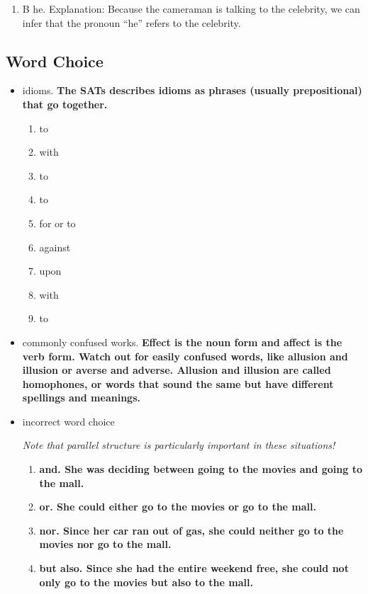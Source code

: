 \begin{enumerate}
\begin{enumerate}
\item B he. Explanation: Because the cameraman is talking to the celebrity, we can infer that the pronoun ``he'' refers to the celebrity. 
\end{enumerate}

\subsection{Word Choice}

\begin{itemize}

\item idioms. \textbf{The SATs describes idioms as phrases (usually prepositional) that go together.}

\begin{enumerate}
\item to
\item with
\item to
\item to
\item for or to
\item against
\item upon
\item with
\item to
\end{enumerate}

\item commonly confused works. \textbf{Effect is the noun form and affect is the verb form. Watch out for easily confused words, like allusion and illusion or averse and adverse.  Allusion and illusion are called homophones, or words that sound the same but have different spellings and meanings.}

\item incorrect word choice

\bigskip 
\textit{Note that parallel structure is particularly important in these situations!}

\begin{enumerate}
\item\textbf{ and. She was deciding between going to the movies and going to the mall.}

\item \textbf{or. She could either go to the movies or go to the mall.}

\item \textbf{nor. Since her car ran out of gas, she could neither go to the movies nor go to the mall.}

\item \textbf{but also. Since she had the entire weekend free, she could not only go to the movies but also to the mall.}


\end{enumerate}
\end{itemize}
\end{enumerate}
